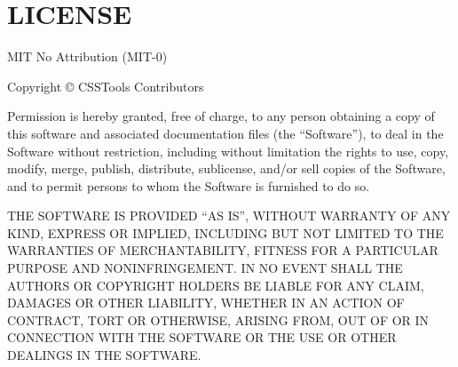 \chapter{LICENSE }
\hypertarget{md__c_1_2xampp_2htdocs_2_g_pagos_ayuntamiento_2node__modules_2_0dcsstools_2color-helpers_2_l_i_c_e_n_s_e}{}\label{md__c_1_2xampp_2htdocs_2_g_pagos_ayuntamiento_2node__modules_2_0dcsstools_2color-helpers_2_l_i_c_e_n_s_e}
MIT No Attribution (MIT-\/0)

Copyright © CSSTools Contributors

Permission is hereby granted, free of charge, to any person obtaining a copy of this software and associated documentation files (the “\+Software”), to deal in the Software without restriction, including without limitation the rights to use, copy, modify, merge, publish, distribute, sublicense, and/or sell copies of the Software, and to permit persons to whom the Software is furnished to do so.

THE SOFTWARE IS PROVIDED “\+AS IS”, WITHOUT WARRANTY OF ANY KIND, EXPRESS OR IMPLIED, INCLUDING BUT NOT LIMITED TO THE WARRANTIES OF MERCHANTABILITY, FITNESS FOR A PARTICULAR PURPOSE AND NONINFRINGEMENT. IN NO EVENT SHALL THE AUTHORS OR COPYRIGHT HOLDERS BE LIABLE FOR ANY CLAIM, DAMAGES OR OTHER LIABILITY, WHETHER IN AN ACTION OF CONTRACT, TORT OR OTHERWISE, ARISING FROM, OUT OF OR IN CONNECTION WITH THE SOFTWARE OR THE USE OR OTHER DEALINGS IN THE SOFTWARE. 